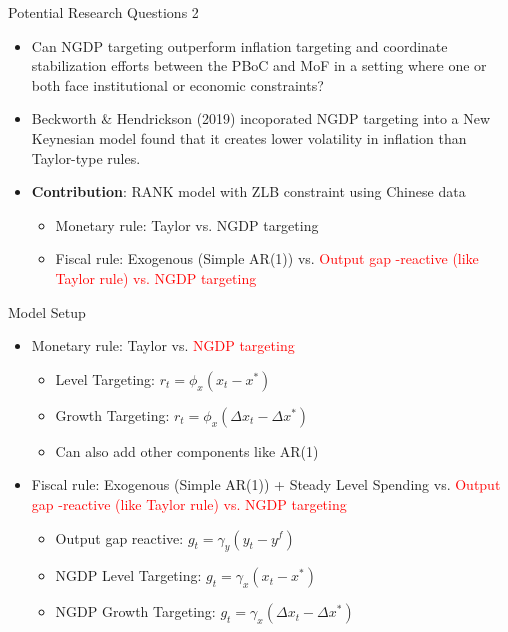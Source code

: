 \documentclass{beamer}
\begin{document}
\begin{frame}{Potential Research Questions 2}
  
    \begin{itemize}
      \item Can NGDP targeting outperform inflation targeting and coordinate stabilization efforts between the PBoC and MoF in a setting where one or both face institutional or economic constraints?
      \item Beckworth \& Hendrickson (2019) incoporated NGDP targeting into a New Keynesian model found that it creates lower volatility in inflation than Taylor-type rules.
      \item \textbf{Contribution}: RANK model with ZLB constraint using Chinese data
      \begin{itemize}
        \item Monetary rule: Taylor vs. NGDP targeting
        \item Fiscal rule: Exogenous (Simple AR(1)) vs. \textcolor{red}{Output gap -reactive (like Taylor rule) vs. NGDP targeting}
      \end{itemize}
    \end{itemize}

\end{frame}

\begin{frame}{Model Setup}
  \begin{itemize}
    \item Monetary rule: Taylor vs. \textcolor{red}{NGDP targeting}
      \begin{itemize}
        \item Level Targeting: $r_t=\phi_x(x_t-x^*)$
        \item Growth Targeting: $r_t=\phi_x(\Delta x_t-\Delta x^*)$
        \item Can also add other components like AR(1)
      \end{itemize}
    \item Fiscal rule: Exogenous (Simple AR(1)) + Steady Level Spending vs. \textcolor{red}{Output gap -reactive (like Taylor rule) vs. NGDP targeting}
      \begin{itemize}
        \item Output gap reactive: $g_t=\gamma_y(y_t-y^f)$
        \item NGDP Level Targeting: $g_t=\gamma_x(x_t-x^*)$
        \item NGDP Growth Targeting: $g_t=\gamma_x(\Delta x_t-\Delta x^*)$
      \end{itemize}
  \end{itemize}
\end{frame}
\end{document}
